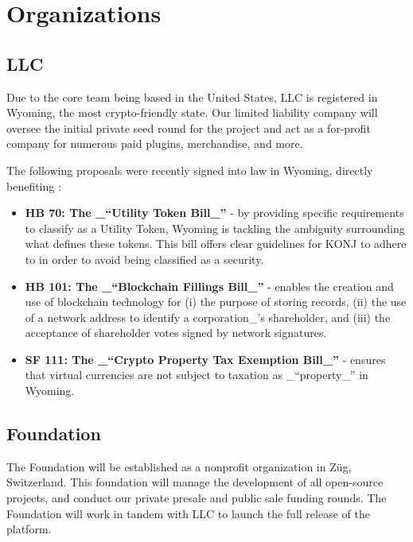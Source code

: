 \documentclass{kwp-builder}
\begin{document}

\newpage

\section{Organizations}
\subsection{\konjure LLC}

\tab Due to the core \konjure team being based in the United States, \konjure LLC is registered in Wyoming, the most crypto-friendly state. Our limited liability company will oversee the initial private seed round for the project and act as a for-profit company for numerous paid plugins, merchandise, and more.\bigskip

The following proposals were recently signed into law in Wyoming, directly benefiting \konjure:

\begin{itemize}
	\item \textbf{HB 70: The \_{“}Utility Token Bill\_{”}} - by providing specific requirements to classify as a Utility Token, Wyoming is tackling the ambiguity surrounding what defines these tokens. This bill offers clear guidelines for KONJ to adhere to in order to avoid being classified as a security.
	
	\item \textbf{HB 101: The \_{“}Blockchain Fillings Bill\_{”}} - enables the creation and use of blockchain technology for (i) the purpose of storing records, (ii) the use of a network address to identify a corporation\_{’}s shareholder, and (iii) the acceptance of shareholder votes signed by network signatures.
		
	\item \textbf{SF 111: The \_{“}Crypto Property Tax Exemption Bill\_{”}} - ensures that virtual currencies are not subject to taxation as \_{“}property\_{”} in Wyoming.

\end{itemize}
\subsection{\konjure Foundation}

\tab The \konjure Foundation will be established as a nonprofit organization in Züg, Switzerland. This foundation will manage the development of all open-source \konjure projects, and conduct our private presale and public sale funding rounds. The \konjure Foundation will work in tandem with \konjure LLC to launch the full release of the platform.
\end{document}
